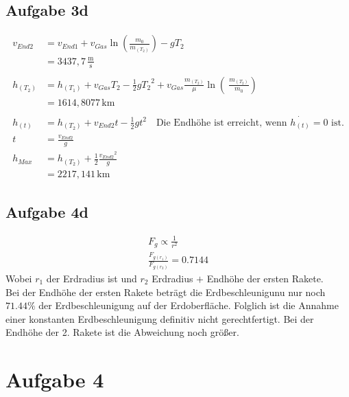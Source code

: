 \documentclass[a4paper,10pt]{extarticle}
\begin{document}
\subsection*{Aufgabe 3d}
\begin{align*}
v_{End2} &= v_{End1} + v_{Gas} \ln\left( \frac{m_0}{m_{(T_2)}} \right) - gT_2 \\
&= 3437,7 \, \frac{\mbox{m}}{\mbox{s}} \\ \\
h_{(T_2)} &= h_{(T_1)} + v_{Gas}T_2 - \frac{1}{2}g{T_2}^2 + v_{Gas} \frac{m_{(T_2)}}{\mu}\ln\left(\ \frac{m_{(T_2)}}{m_0} \right) \\
&= 1614,8077 \, \mbox{km} \\ \\
h_{(t)} &= h_{(T_2)} + v_{End2}t - \frac{1}{2}gt^2 \quad \mbox{Die Endhöhe ist erreicht, wenn $\dot{h_{(t)}} = 0$ ist.} \\
t &= \frac{v_{End2}}{g} \\
h_{Max} &= h_{(T_2)} + \frac{1}{2} \frac{{v_{End2}}^2}{g} \\
&= 2217,141 \, \mbox{km}
\end{align*}

\subsection*{Aufgabe 4d}
\begin{align*}
F_g \propto \frac{1}{r^2} \\
\frac{F_{g(r_1)}}{F_{g(r_2)}} = 0.7144 
\end{align*}
Wobei $r_1$ der Erdradius ist und $r_2$ Erdradius $+$ Endhöhe der ersten Rakete. \\
Bei der Endhöhe der ersten Rakete beträgt die Erdbeschleunigunu nur noch $71.44\%$ der Erdbeschleunigung auf der Erdoberfläche. Folglich ist die Annahme einer konstanten Erdbeschleunigung definitiv nicht gerechtfertigt. Bei der Endhöhe der 2. Rakete ist die Abweichung noch größer.

\section*{Aufgabe 4}
\end{document}
